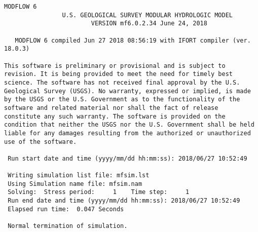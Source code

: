 {\small
\begin{lstlisting}[style=modeloutput]
                                   MODFLOW 6
                U.S. GEOLOGICAL SURVEY MODULAR HYDROLOGIC MODEL
                        VERSION mf6.0.2.34 June 24, 2018

   MODFLOW 6 compiled Jun 27 2018 08:56:19 with IFORT compiler (ver. 18.0.3)

This software is preliminary or provisional and is subject to
revision. It is being provided to meet the need for timely best
science. The software has not received final approval by the U.S.
Geological Survey (USGS). No warranty, expressed or implied, is made
by the USGS or the U.S. Government as to the functionality of the
software and related material nor shall the fact of release
constitute any such warranty. The software is provided on the
condition that neither the USGS nor the U.S. Government shall be held
liable for any damages resulting from the authorized or unauthorized
use of the software.

 Run start date and time (yyyy/mm/dd hh:mm:ss): 2018/06/27 10:52:49

 Writing simulation list file: mfsim.lst
 Using Simulation name file: mfsim.nam
 Solving:  Stress period:     1    Time step:     1
 Run end date and time (yyyy/mm/dd hh:mm:ss): 2018/06/27 10:52:49
 Elapsed run time:  0.047 Seconds

 Normal termination of simulation.

\end{lstlisting}
}
